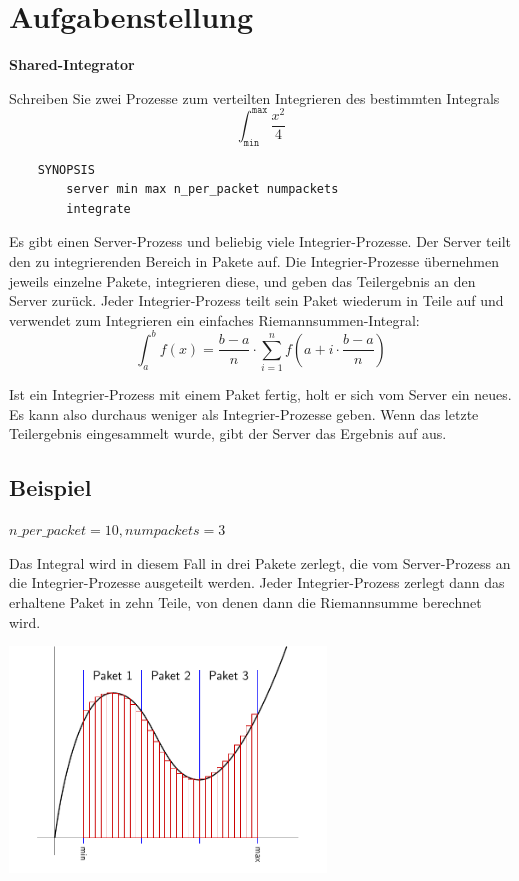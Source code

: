 

\usepackage{graphicx}




\section*{Aufgabenstellung}

\textbf{Shared-Integrator}

Schreiben Sie zwei Prozesse zum verteilten Integrieren des bestimmten Integrals
$$\int^{\mathtt{max}}_{\mathtt{min}} \frac{x^2}{4}$$

\begin{verbatim}
    SYNOPSIS
        server min max n_per_packet numpackets
        integrate
\end{verbatim}

Es gibt einen Server-Prozess und beliebig viele Integrier-Prozesse. Der Server
teilt den zu integrierenden Bereich in  Pakete auf. Die
Integrier-Prozesse übernehmen jeweils einzelne Pakete, integrieren diese, und
geben das Teilergebnis an den Server zurück. Jeder Integrier-Prozess teilt sein
Paket wiederum in  Teile auf und verwendet zum Integrieren
ein einfaches Riemannsummen-Integral:
$$\int^b_a f(x) = \frac{b-a}n \cdot \sum_{i=1}^{n} f\left(a + i\cdot \frac{b-a}{n}\right)$$

Ist ein Integrier-Prozess mit einem Paket fertig, holt er sich vom Server ein
neues. Es kann also durchaus weniger als  Integrier-Prozesse
geben. Wenn das letzte Teilergebnis eingesammelt wurde, gibt der Server das
Ergebnis auf  aus.

\subsection*{Beispiel}

$n\_per\_packet = 10, numpackets = 3$

Das Integral wird in diesem Fall in drei Pakete zerlegt, die vom Server-Prozess
an die Integrier-Prozesse ausgeteilt werden. Jeder Integrier-Prozess zerlegt
dann das erhaltene Paket in zehn Teile, von denen dann die Riemannsumme
berechnet wird.

\begin{center}
\includegraphics[height=6cm]{integfigure.pdf}
\end{center}


